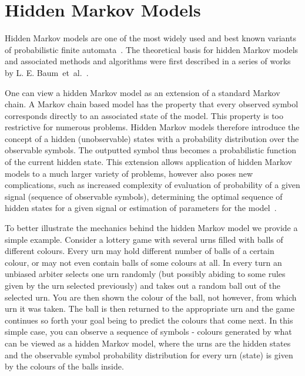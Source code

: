 \section{Hidden Markov Models}

Hidden Markov models are one of the most widely used and best known variants of probabilistic finite automata~\cite{pautomacTR, Rabiner89hmm}. The theoretical basis for hidden Markov models and associated methods and algorithms were first described in a series of works by L. E. Baum~et~al.~\cite{baum1966, baum1967, baum1968, baum1970, baum1972}.

One can view a hidden Markov model as an extension of a standard Markov chain. A Markov chain based model has the property that every observed symbol corresponds directly to an associated state of the model. This property is too restrictive for numerous problems. Hidden Markov models therefore introduce the concept of a hidden (unobservable) states with a probability distribution over the observable symbols. The outputted symbol thus becomes a probabilistic function of the current hidden state. This extension allows application of hidden Markov models to a much larger variety of problems, however also poses new complications, such as increased complexity of evaluation of probability of a given signal (sequence of observable symbols), determining the optimal sequence of hidden states for a given signal or estimation of parameters for the model~\cite{Rabiner89hmm}.

To better illustrate the mechanics behind the hidden Markov model we provide a simple example. Consider a lottery game with several urns filled with balls of different colours. Every urn may hold different number of balls of a certain colour, or may not even contain balls of some colours at all. In every turn an unbiased arbiter selects one urn randomly (but possibly abiding to some rules given by the urn selected previously) and takes out a random ball out of the selected urn. You are then shown the colour of the ball, not however, from which urn it was taken. The ball is then returned to the appropriate urn and the game continues so forth your goal being to predict the colours that come next. In this simple case, you can observe a sequence of symbols - colours generated by what can be viewed as a hidden Markov model, where the urns are the hidden states and the observable symbol probability distribution for every urn (state) is given by the colours of the balls inside.

